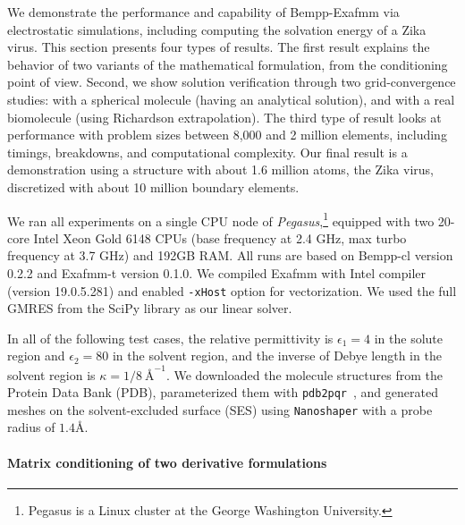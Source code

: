 We demonstrate the performance and capability of Bempp-Exafmm via electrostatic simulations, including computing the solvation energy of a Zika virus.
This section presents four types of results. 
The first result explains the behavior of two variants of the mathematical formulation, from the conditioning point of view. 
Second, we show solution verification through two grid-convergence studies: with a spherical molecule (having an analytical solution), and with a real biomolecule (using Richardson extrapolation).
The third type of result looks at performance with problem sizes between 8,000 and 2 million elements, including timings, breakdowns, and computational complexity.
Our final result is a demonstration using a structure with about 1.6 million atoms, the Zika virus, discretized with about 10 million boundary elements.

We ran all experiments on a single CPU node of \textit{Pegasus},\footnote{Pegasus is a Linux cluster at the George Washington University.} equipped with two 20-core Intel Xeon Gold 6148 CPUs (base frequency at 2.4 GHz, max turbo frequency at 3.7 GHz) and 192GB RAM.
All runs are based on Bempp-cl version 0.2.2 and Exafmm-t version 0.1.0.
We compiled Exafmm with Intel compiler (version 19.0.5.281) and enabled \texttt{-xHost} option for vectorization.
We used the full GMRES from the SciPy library as our linear solver.

In all of the following test cases, the relative permittivity is $\epsilon_1 = 4$ in the solute region and $\epsilon_2 = 80$ in the solvent region, and the inverse of Debye length in the solvent region is $\kappa = 1/8\ {\si{\angstrom}}^{-1}$.
We downloaded the molecule structures from the Protein Data Bank (PDB), parameterized them with \texttt{pdb2pqr}~\cite{DolinskyETal2004}, and generated meshes on the solvent-excluded surface (SES) using \texttt{Nanoshaper} with a probe radius of $1.4 \si{\angstrom}$.

\paragraph{Matrix conditioning of two derivative formulations} \label{result_conditioning}

